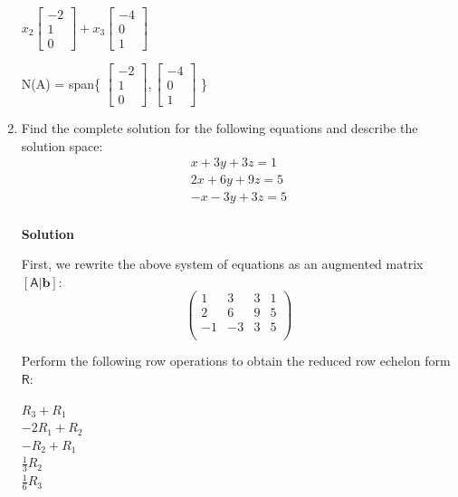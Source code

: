 \documentclass[a4paper, 11pt]{article}
\newcommand{\mat}[1]{\boldsymbol { \mathsf{#1}} }
\begin{document}
\begin{enumerate}
$x_2
\begin{bmatrix} 
-2 \\ 1 \\ 0
\end{bmatrix}
+
x_3
\begin{bmatrix} 
-4 \\ 0 \\ 1
\end{bmatrix}
$

N(A) = span\{
$\begin{bmatrix} 
-2 \\ 1 \\ 0
\end{bmatrix}
,
\begin{bmatrix} 
-4 \\ 0 \\ 1
\end{bmatrix}
$
\}


\item Find the complete solution for the following equations and describe the solution space:
\begin{equation} \label{eq1}
\begin{split}
x + 3y + 3z = 1 \\
2x + 6y + 9z = 5 \\
-x - 3y +3z =5 \\
\end{split}
\end{equation}

\textbf{Solution}

First, we rewrite the above system of equations as an augmented matrix $[\mat{A}|\textbf{b}]$:
\begin{equation*}
    \left(\begin{array}{ccc|c}  
    1 & 3 & 3 & 1 \\  
    2 & 6 & 9 & 5 \\
    -1 & -3 & 3 & 5 \\
    \end{array}\right)
\end{equation*}

Perform the following row operations to obtain the reduced row echelon form $\mat{R}$:

\begin{center}
    $R_{3} + R_{1}$ \\
    $-2R_{1} + R_{2}$ \\
    $-R_{2} + R_{1}$ \\
    $\frac{1}{3}R_{2}$ \\
    $\frac{1}{6}R_{3}$ \\
\end{center}


\end{enumerate}
\end{document}
